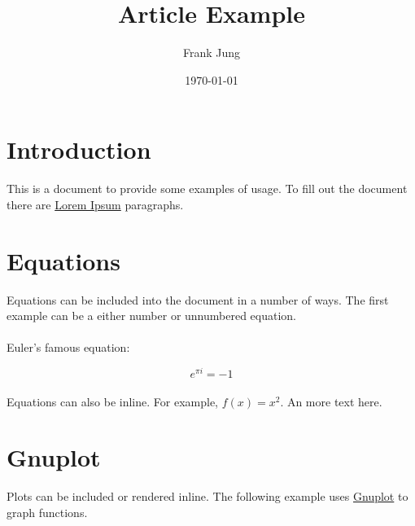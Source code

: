 \documentclass[10pt,a4paper]{article}
\title{\LaTeXe{} Article Example}
\author{Frank Jung}
\date{\today}
\begin{document}
\maketitle
\newpage

\tableofcontents{}
\listoffigures
\listoftables
\newpage

\newpage

\newcommand{\sectionbreak}{\clearpage}

\section*{Introduction}

This is a \LaTeXe{} document to provide some examples of usage. To fill out the
document there are \href{http://www.lipsum.com/}{Lorem Ipsum} paragraphs.

\lipsum[1]

\sectionbreak{}

\section*{Equations}

Equations can be included into the document in a number of ways. The first
example can be a either number or unnumbered equation.

\paragraph{}
Euler's famous equation:

\begin{equation}
  e^{\pi i} = -1
\end{equation}

\paragraph{}
Equations can also be inline. For example, $f(x) = x^2$. An more text here.
\lipsum[2]

\sectionbreak{}

\section*{Gnuplot}

Plots can be included or rendered inline. The following example uses
\href{http://www.gnuplot.info/}{Gnuplot} to graph functions.
\end{document}
